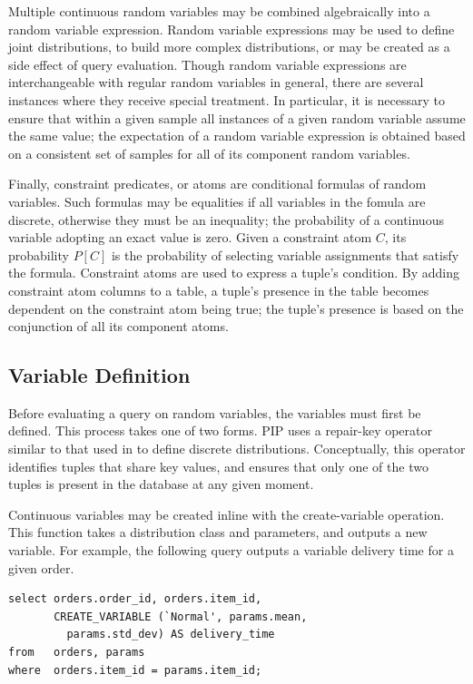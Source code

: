 Multiple continuous random variables may be combined algebraically into a random variable expression.  Random variable expressions may be used to define joint distributions, to build more complex distributions, or may be created as a side effect of query evaluation.  Though random variable expressions are interchangeable with regular random variables in general, there are several instances where they receive special treatment.  In particular, it is necessary to ensure that within a given sample all instances of a given random variable assume the same value; the expectation of a random variable expression is obtained based on a consistent set of samples for all of its component random variables.

Finally, constraint predicates, or atoms are conditional formulas of random variables.  Such formulas may be equalities if all variables in the fomula are discrete, otherwise they must be an inequality; the probability of a continuous variable adopting an exact value is zero.  Given a constraint atom $C$, its probability $P[C]$ is the probability of selecting variable assignments that satisfy the formula.  Constraint atoms are used to express a tuple's condition.  By adding constraint atom columns to a table, a tuple's presence in the table becomes dependent on the constraint atom being true; the tuple's presence is based on the conjunction of all its component atoms.

\subsection{Variable Definition}
Before evaluating a query on random variables, the variables must first be defined.  This process takes one of two forms.  PIP uses a repair-key operator similar to that used in \cite{KochMayBMS2008} to define discrete distributions.  Conceptually, this operator identifies tuples that share key values, and ensures that only one of the two tuples is present in the database at any given moment.  

Continuous variables may be created inline with the create-variable operation.  This function takes a distribution class and parameters, and outputs a new variable.  For example, the following query outputs a variable delivery time for a given order.

\begin{verbatim}
select orders.order_id, orders.item_id,
       CREATE_VARIABLE (`Normal', params.mean,
         params.std_dev) AS delivery_time
from   orders, params
where  orders.item_id = params.item_id;
\end{verbatim}

